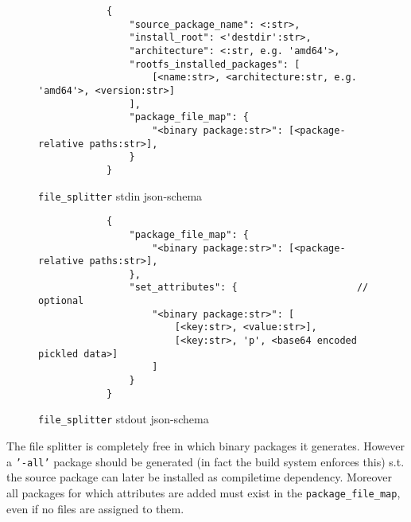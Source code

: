 \documentclass[a4paper]{scrartcl}
\begin{document}
	\begin{figure}[htp]
		\centering
		
		\begin{minipage}{0.8\textwidth}
			\begin{lstlisting}
			{
				"source_package_name": <:str>,
				"install_root": <'destdir':str>,
				"architecture": <:str, e.g. 'amd64'>,
				"rootfs_installed_packages": [
					[<name:str>, <architecture:str, e.g. 'amd64'>, <version:str>]
				],
				"package_file_map": {
					"<binary package:str>": [<package-relative paths:str>],
				}
			}
			\end{lstlisting}
		\end{minipage}
		
		\caption{\texttt{file\_splitter} stdin json-schema}
		\label{fig:file_splitter_stdin_schema}
	\end{figure}

	\begin{figure}[htp]
		\centering
		
		\begin{minipage}{0.8\textwidth}
			\begin{lstlisting}
			{
				"package_file_map": {
					"<binary package:str>": [<package-relative paths:str>],
				},
				"set_attributes": {						// optional
					"<binary package:str>": [
						[<key:str>, <value:str>],
						[<key:str>, 'p', <base64 encoded pickled data>]
					]
				}
			}
			\end{lstlisting}
		\end{minipage}
		
		\caption{\texttt{file\_splitter} stdout json-schema}
		\label{fig:file_splitter_stdout_schema}
	\end{figure}

	The file splitter is completely free in which binary packages it generates. However a \texttt{'-all'} package should be generated (in fact the build system enforces this) s.t. the source package can later be installed as compiletime dependency. Moreover all packages for which attributes are added must exist in the \texttt{package\_file\_map}, even if no files are assigned to them.
	
\end{document}
